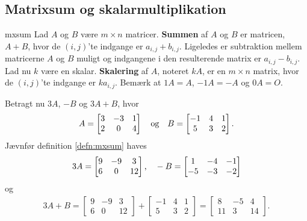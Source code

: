 \subsection{Matrixsum og skalarmultiplikation}
%
\begin{defn}{}{mxsum}
Lad $A$ og $B$ være $m \times n$ matricer.
\textbf{Summen} af $A$ og $B$  er matricen, $A + B$, hvor de $(i,j)$'te indgange er $a_{i,j} + b_{i,j}$.
Ligeledes er subtraktion mellem matricerne $A$ og $B$ muligt og indgangene i den resulterende matrix er $a_{i,j} - b_{i,j}$.
Lad nu $k$ være en skalar.
\textbf{Skalering} af $A$, noteret $kA$, er en $m \times n$ matrix, hvor de $(i,j)$'te indgange er $ka_{i,j}$.
Bemærk at $1A = A$, $-1A = -A$ og $0A = O$.
\end{defn}
%
\begin{eks}
Betragt nu $3A$, $-B$ og $3A+B$, hvor 
\begin{align*}
A= 
\begin{bmatrix}
3	&	-3	&	1\\
2	&	0	&	4
\end{bmatrix}
\text{\phantom{---}og\phantom{---}}
B= 
\begin{bmatrix}
-1	&	4	&	1\\
5	&	3	&	2
\end{bmatrix}.
\end{align*}
Jævnfør definition \ref{defn:mxsum} haves
\begin{align*}
3A= 
\begin{bmatrix}
9	&	-9	&	3\\
6	&	0	&	12
\end{bmatrix}
\text{,\phantom{---}}
-B= 
\begin{bmatrix}
1	&	-4	&	-1\\
-5	&	-3	&	-2
\end{bmatrix}
\end{align*}
og
\begin{align*}
3A+B= 
\begin{bmatrix}
9	&	-9	&	3\\
6	&	0	&	12
\end{bmatrix}
+ 
\begin{bmatrix}
-1	&	4	&	1\\
5	&	3	&	2
\end{bmatrix}
=
\begin{bmatrix}
8	&	-5	&	4\\
11	&	3	&	14
\end{bmatrix}.
\end{align*}
\end{eks}
%
